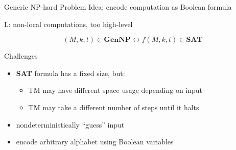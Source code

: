 \documentclass[11pt,usenames,dvipsnames,
hyperref={pdfencoding=auto,psdextra}]{beamer}
\newcommand*{\sat}{\textbf{SAT}}
\newcommand*{\gennp}{\textbf{GenNP}}
\begin{document}
\begin{frame}{Generic NP-hard Problem}
  Idea: encode computation as Boolean formula


  \begin{overlayarea}{\textwidth}{0.4\textwidth}
     {
      \vspace{3ex}
      \begin{center}
        L: non-local computations, too high-level \frownie{}
      \end{center}
    }

    \[ 
      (M, k, t) \in \gennp{} \leftrightarrow f(M, k, t) \in \sat{}
    \]
  \end{overlayarea}
\end{frame}

\begin{frame}{Challenges}
  \begin{itemize}
    \item \sat{} formula has a fixed size, but: 
      \begin{itemize} 
        \item TM may have different space usage depending on input
        \item TM may take a different number of steps until it halts
      \end{itemize}
    \item nondeterministically ``guess'' input
    \item encode arbitrary alphabet using Boolean variables
  \end{itemize}
\end{frame}
\end{document}
